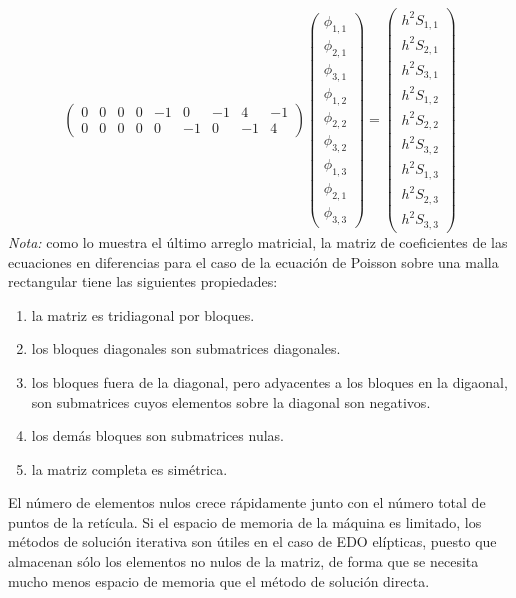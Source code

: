 \documentclass[12pt]{article}
\numberwithin{equation}{section}
\begin{document}
\begin{enumerate}
\begin{equation*}
\begin{pmatrix}
	0 & 0 & 0 & 0 & -1 & 0 & -1 & 4 & -1 \\
	0 & 0 & 0 & 0 & 0 & -1 & 0 & -1 & 4 
	\end{pmatrix}
	\begin{pmatrix}
		\phi_{1,1} \\
		\phi_{2,1} \\
		\phi_{3,1} \\
		\phi_{1,2} \\
		\phi_{2,2} \\
		\phi_{3,2} \\
		\phi_{1,3} \\
		\phi_{2,1} \\
		\phi_{3,3} 
	\end{pmatrix}
		=
	\begin{pmatrix}
		h^{2} S_{1,1} \\
		h^{2} S_{2,1} \\
		h^{2} S_{3,1} \\
		h^{2} S_{1,2} \\
		h^{2} S_{2,2} \\
		h^{2} S_{3,2} \\
		h^{2} S_{1,3} \\
		h^{2} S_{2,3} \\
		h^{2} S_{3,3}
	\end{pmatrix}
\end{equation*}
\textit{Nota: } como lo muestra el último arreglo matricial, la matriz de coeficientes de las ecuaciones en diferencias para el caso de la ecuación de Poisson sobre una malla rectangular tiene las siguientes propiedades:
\begin{enumerate}
\item la matriz es tridiagonal por bloques.
\item los bloques diagonales son submatrices diagonales.
\item los bloques fuera de la diagonal, pero adyacentes a los bloques en la digaonal, son submatrices cuyos elementos sobre la diagonal son negativos.
\item los demás bloques son submatrices nulas.
\item la matriz completa es simétrica.
\end{enumerate}
El número de elementos nulos crece rápidamente junto con el número total de puntos de la retícula. Si el espacio de memoria de la máquina es limitado, los métodos de solución iterativa son útiles en el caso de EDO elípticas, puesto que almacenan sólo los elementos no nulos de la matriz, de forma que se necesita mucho menos espacio de memoria que el método de solución directa.
\end{enumerate}
\end{document}
